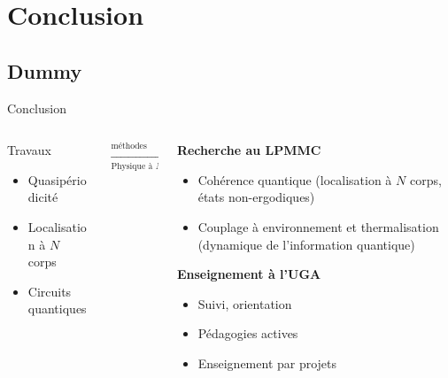 \section{Conclusion}
\subsection{Dummy}
\begin{frame}{Conclusion}

\begin{columns}
	\begin{column}{0.4\textwidth}
		Travaux
			\begin{itemize}
				\item Quasipériodicité
				\item Localisation à $N$ corps
				\item Circuits quantiques
			\end{itemize}
		\end{column}
		\begin{column}{0.2\textwidth}
			$\xrightarrow[\text{Physique à $N$ corps}]{\text{méthodes numériques}}$
		\end{column}
		\begin{column}{0.4\textwidth}
			\textbf{Recherche au LPMMC}
			\begin{itemize}
				\item Cohérence quantique (localisation à $N$ corps, états non-ergodiques)
				\item Couplage à environnement et thermalisation (dynamique de l'information quantique)
			\end{itemize}
			
			\begin{block}{\textbf{Enseignement à l'UGA}}
	\begin{itemize}
		\item Suivi, orientation
		\item Pédagogies actives
		\item Enseignement par projets
	\end{itemize}
\end{block}

		\end{column}
	\end{columns}
\end{frame}
